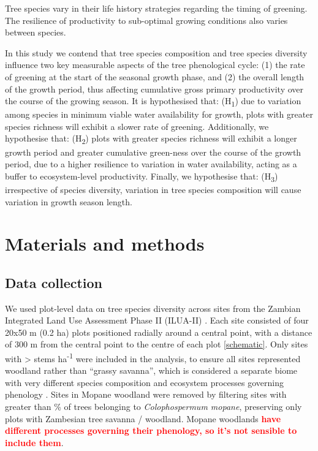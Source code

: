 \documentclass[11pt,a4paper]{article}
\newcommand{\todo}[1]{\textcolor{red}{\textbf{#1}}}   %
\begin{document}
Tree species vary in their life history strategies regarding the timing of greening. The resilience of productivity to sub-optimal growing conditions also varies between species. 

In this study we contend that tree species composition and tree species diversity influence two key measurable aspects of the tree phenological cycle: (1) the rate of greening at the start of the seasonal growth phase, and (2) the overall length of the growth period, thus affecting cumulative gross primary productivity over the course of the growing season. It is hypothesised that: (H\textsubscript{1}) due to variation among species in minimum viable water availability for growth, plots with greater species richness will exhibit a slower rate of greening. Additionally, we hypothesise that: (H\textsubscript{2}) plots with greater species richness will exhibit a longer growth period and greater cumulative green-ness over the course of the growth period, due to a higher resilience to variation in water availability, acting as a buffer to ecosystem-level productivity. Finally, we hypothesise that: (H\textsubscript{3}) irrespective of species diversity, variation in tree species composition will cause variation in growth season length. 

\section{Materials and methods}

\subsection{Data collection}

We used plot-level data on tree species diversity across \nSites{} sites from the Zambian Integrated Land Use Assessment Phase II (ILUA-II) \citep{}. Each site consisted of four 20x50 m (0.2 ha) plots positioned radially around a central point, with a distance of 300 m from the central point to the centre of each plot \autoref{schematic}. Only sites with >\stemsHa{} stems ha\textsuperscript{-1} were included in the analysis, to ensure all sites represented woodland rather than “grassy savanna”, which is considered a separate biome with very different species composition and ecosystem processes governing phenology \citep{Parr2014}. Sites in Mopane woodland were removed by filtering sites with greater than \mopanePer{}\% of trees belonging to \textit{Colophospermum mopane}, preserving only plots with Zambesian tree savanna / woodland. Mopane woodlands \todo{have different processes governing their phenology, so it's not sensible to include them}.
\end{document}

